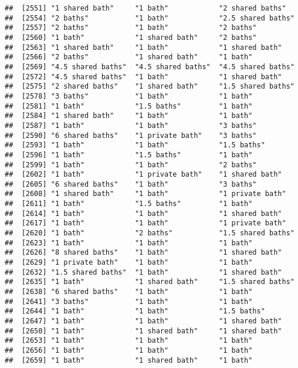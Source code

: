 \documentclass[
]{article}
\begin{document}
\begin{verbatim}
##  [2551] "1 shared bath"     "1 bath"            "2 shared baths"   
##  [2554] "2 baths"           "1 bath"            "2.5 shared baths" 
##  [2557] "2 baths"           "1 bath"            "2 baths"          
##  [2560] "1 bath"            "1 shared bath"     "2 baths"          
##  [2563] "1 shared bath"     "1 bath"            "1 shared bath"    
##  [2566] "2 baths"           "1 shared bath"     "1 bath"           
##  [2569] "4.5 shared baths"  "4.5 shared baths"  "4.5 shared baths" 
##  [2572] "4.5 shared baths"  "1 bath"            "1 shared bath"    
##  [2575] "2 shared baths"    "1 shared bath"     "1.5 shared baths" 
##  [2578] "3 baths"           "1 bath"            "1 bath"           
##  [2581] "1 bath"            "1.5 baths"         "1 bath"           
##  [2584] "1 shared bath"     "1 bath"            "1 bath"           
##  [2587] "1 bath"            "1 bath"            "3 baths"          
##  [2590] "6 shared baths"    "1 private bath"    "3 baths"          
##  [2593] "1 bath"            "1 bath"            "1.5 baths"        
##  [2596] "1 bath"            "1.5 baths"         "1 bath"           
##  [2599] "1 bath"            "1 bath"            "2 baths"          
##  [2602] "1 bath"            "1 private bath"    "1 shared bath"    
##  [2605] "6 shared baths"    "1 bath"            "3 baths"          
##  [2608] "1 shared bath"     "1 bath"            "1 private bath"   
##  [2611] "1 bath"            "1.5 baths"         "1 bath"           
##  [2614] "1 bath"            "1 bath"            "1 shared bath"    
##  [2617] "1 bath"            "1 bath"            "1 private bath"   
##  [2620] "1 bath"            "2 baths"           "1.5 shared baths" 
##  [2623] "1 bath"            "1 bath"            "1 bath"           
##  [2626] "8 shared baths"    "1 bath"            "1 shared bath"    
##  [2629] "1 private bath"    "1 bath"            "1 bath"           
##  [2632] "1.5 shared baths"  "1 bath"            "1 shared bath"    
##  [2635] "1 bath"            "1 shared bath"     "1.5 shared baths" 
##  [2638] "6 shared baths"    "1 bath"            "1 bath"           
##  [2641] "3 baths"           "1 bath"            "1 bath"           
##  [2644] "1 bath"            "1 bath"            "1.5 baths"        
##  [2647] "1 bath"            "1 bath"            "1 shared bath"    
##  [2650] "1 bath"            "1 shared bath"     "1 shared bath"    
##  [2653] "1 bath"            "1 bath"            "1 bath"           
##  [2656] "1 bath"            "1 bath"            "1 bath"           
##  [2659] "1 bath"            "1 shared bath"     "1 bath"           

\end{verbatim}
\end{document}

